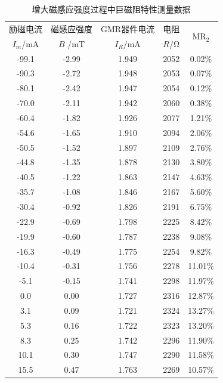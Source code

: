 \documentclass{thuemp}
\begin{document}
\begin{table}[H]
    \centering
    \captionnamefont{\wuhao\bf\heiti}
    \captiontitlefont{\wuhao\bf\heiti}
    \caption{增大磁感应强度过程中巨磁阻特性测量数据} \label{tab:magnetoresistance_incr}
    \liuhao
    \begin{tabular}{ccccc}
        \toprule
        励磁电流 & 磁感应强度 & GMR器件电流 & 电阻 & \multirow{2}{*}{$\mathrm{MR_2}$}\\
        $I_m$/\si{\milli\ampere} & $B$ /\si{\milli\tesla} & $I_R$$ /\si{\milli\ampere}$ & $R$$/\si{\ohm} $& \\
        \midrule
        -99.1  & -2.99 & 1.949 & 2052 & 0.02\%  \\
        -90.3  & -2.72 & 1.948 & 2053 & 0.07\%  \\
        -80.1  & -2.42 & 1.947 & 2054 & 0.12\%  \\
        -70.0  & -2.11 & 1.942 & 2060 & 0.38\%  \\
        -60.4  & -1.82 & 1.926 & 2077 & 1.21\%  \\
        -54.6  & -1.65 & 1.910 & 2094 & 2.06\%  \\
        -50.5  & -1.52 & 1.897 & 2109 & 2.76\%  \\
        -44.8  & -1.35 & 1.878 & 2130 & 3.80\%  \\
        -40.5  & -1.22 & 1.863 & 2147 & 4.63\%  \\
        -35.7  & -1.08 & 1.846 & 2167 & 5.60\%  \\
        -30.4  & -0.92 & 1.826 & 2191 & 6.75\%  \\
        -22.9  & -0.69 & 1.798 & 2225 & 8.42\%  \\
        -19.9  & -0.60 & 1.787 & 2238 & 9.08\%  \\
        -16.3  & -0.49 & 1.775 & 2254 & 9.82\%  \\
        -10.4  & -0.31 & 1.756 & 2278 & 11.01\% \\
        -5.1   & -0.15 & 1.741 & 2298 & 11.97\% \\
        0.0    & 0.00  & 1.727 & 2316 & 12.87\% \\
        3.1    & 0.09  & 1.721 & 2324 & 13.27\% \\
        5.3    & 0.16  & 1.722 & 2323 & 13.20\% \\
        8.3    & 0.25  & 1.742 & 2296 & 11.90\% \\
        10.1   & 0.30  & 1.747 & 2290 & 11.58\% \\
        15.5   & 0.47  & 1.763 & 2269 & 10.57\% \\

\end{tabular}
\end{table}
\end{document}
